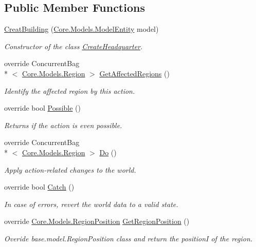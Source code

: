 \subsection*{Public Member Functions}
\begin{DoxyCompactItemize}
\item 
\hyperlink{classCore_1_1Controllers_1_1Actions_1_1CreatBuilding_ab9867559b36ad20f4b9add3cecc9df0a}{Creat\-Building} (\hyperlink{classCore_1_1Models_1_1ModelEntity}{Core.\-Models.\-Model\-Entity} model)
\begin{DoxyCompactList}\small\item\em Constructor of the class \hyperlink{classCore_1_1Controllers_1_1Actions_1_1CreateHeadquarter}{Create\-Headquarter}. \end{DoxyCompactList}\item 
override Concurrent\-Bag\\*
$<$ \hyperlink{classCore_1_1Models_1_1Region}{Core.\-Models.\-Region} $>$ \hyperlink{classCore_1_1Controllers_1_1Actions_1_1CreatBuilding_a5bf6ef12c81df393d3bff87f129cb5f5}{Get\-Affected\-Regions} ()
\begin{DoxyCompactList}\small\item\em Identify the affected region by this action. \end{DoxyCompactList}\item 
override bool \hyperlink{classCore_1_1Controllers_1_1Actions_1_1CreatBuilding_a10b4bb58784bd5da25abac85727e30b0}{Possible} ()
\begin{DoxyCompactList}\small\item\em Returns if the action is even possible. \end{DoxyCompactList}\item 
override Concurrent\-Bag\\*
$<$ \hyperlink{classCore_1_1Models_1_1Region}{Core.\-Models.\-Region} $>$ \hyperlink{classCore_1_1Controllers_1_1Actions_1_1CreatBuilding_a9592b18efa8b8fa114fb3900c5880f06}{Do} ()
\begin{DoxyCompactList}\small\item\em Apply action-\/related changes to the world. \end{DoxyCompactList}\item 
override bool \hyperlink{classCore_1_1Controllers_1_1Actions_1_1CreatBuilding_a697d2c89ef9823be8c5601ff789ea879}{Catch} ()
\begin{DoxyCompactList}\small\item\em In case of errors, revert the world data to a valid state. \end{DoxyCompactList}\item 
override \hyperlink{classCore_1_1Models_1_1RegionPosition}{Core.\-Models.\-Region\-Position} \hyperlink{classCore_1_1Controllers_1_1Actions_1_1CreatBuilding_a03023385415b401cc3361d8b37d13899}{Get\-Region\-Position} ()
\begin{DoxyCompactList}\small\item\em Overide base.\-model.\-Region\-Position class and return the position\-I of the region. \end{DoxyCompactList}\end{DoxyCompactItemize}
